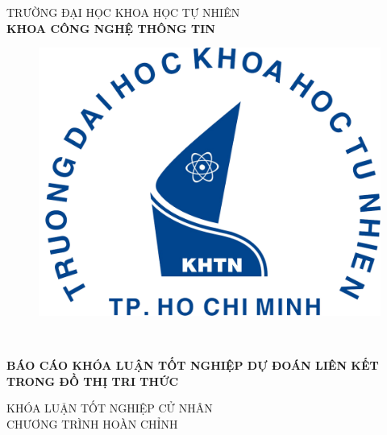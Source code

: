 \begin{titlepage}

\begin{center}
TRƯỜNG ĐẠI HỌC KHOA HỌC TỰ NHIÊN\\
\textbf{KHOA CÔNG NGHỆ THÔNG TIN}\\[2cm]

\begin{figure}[htp]
\centering
\includegraphics[width=8 cm]{images/logo-khtn.png}
{\\[1cm]}
\end{figure}

{ \Large \bfseries \tenSV \\[1cm] } 


{ \Large \bfseries BÁO CÁO KHÓA LUẬN TỐT NGHIỆP DỰ ĐOÁN LIÊN KẾT TRONG ĐỒ THỊ TRI THỨC\\[2cm]} 


\large KHÓA LUẬN TỐT NGHIỆP CỬ NHÂN\\
\large CHƯƠNG TRÌNH HOÀN CHỈNH\\




\end{center}
\end{titlepage}

